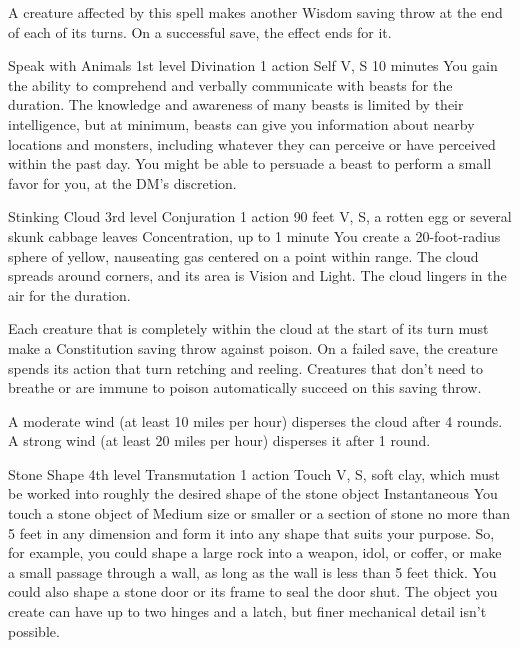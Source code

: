\documentclass[10pt,a4paper,twoside,bg=print,twocolumn,openany,nodeprecatedcode]{dndbook}
\begin{document}
A creature affected by this spell makes another Wisdom saving throw at the end of each of its turns. On a successful save, the effect ends for it.



\DndSpellHeader%
{Speak with Animals}
{1st level Divination}
{1 action}
{Self}
{V, S}
{10 minutes}
You gain the ability to comprehend and verbally communicate with beasts for the duration. The knowledge and awareness of many beasts is limited by their intelligence, but at minimum, beasts can give you information about nearby locations and monsters, including whatever they can perceive or have perceived within the past day. You might be able to persuade a beast to perform a small favor for you, at the DM's discretion.



\DndSpellHeader%
{Stinking Cloud}
{3rd level Conjuration}
{1 action}
{90 feet}
{V, S, a rotten egg or several skunk cabbage leaves}
{Concentration, up to 1 minute}
You create a 20-foot-radius sphere of yellow, nauseating gas centered on a point within range. The cloud spreads around corners, and its area is Vision and Light. The cloud lingers in the air for the duration.

Each creature that is completely within the cloud at the start of its turn must make a Constitution saving throw against poison. On a failed save, the creature spends its action that turn retching and reeling. Creatures that don't need to breathe or are immune to poison automatically succeed on this saving throw.

A moderate wind (at least 10 miles per hour) disperses the cloud after 4 rounds. A strong wind (at least 20 miles per hour) disperses it after 1 round.



\DndSpellHeader%
{Stone Shape}
{4th level Transmutation}
{1 action}
{Touch}
{V, S, soft clay, which must be worked into roughly the desired shape of the stone object}
{Instantaneous}
You touch a stone object of Medium size or smaller or a section of stone no more than 5 feet in any dimension and form it into any shape that suits your purpose. So, for example, you could shape a large rock into a weapon, idol, or coffer, or make a small passage through a wall, as long as the wall is less than 5 feet thick. You could also shape a stone door or its frame to seal the door shut. The object you create can have up to two hinges and a latch, but finer mechanical detail isn't possible.
\end{document}
